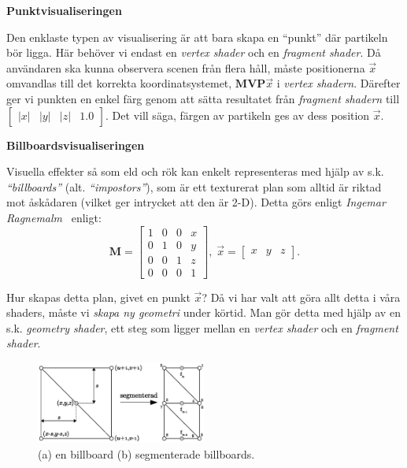\documentclass[a4paper]{article}
\begin{document}
\begin{multicols}{2}
\textbf{Punktvisualiseringen}

Den enklaste typen av visualisering är att bara skapa en ``punkt'' där partikeln bör ligga. Här behöver vi endast en \emph{vertex shader} och en \emph{fragment shader}. Då användaren ska kunna observera scenen från flera håll, måste positionerna \(\vec{x}\) omvandlas till det korrekta koordinatsystemet, \(\mathbf{MVP}\vec{x}\) i \emph{vertex shadern}. Därefter ger vi punkten en enkel färg genom att sätta resultatet från \emph{fragment shadern} till \(\begin{bmatrix}|x| & |y| & |z| & 1.0\end{bmatrix}\). Det vill säga, färgen av partikeln ges av dess position \(\vec{x}\).

\textbf{Billboardsvisualiseringen}

Visuella effekter så som eld och rök kan enkelt representeras med hjälp av s.k. \emph{``billboards''} (alt. \emph{``impostors''}), som är ett texturerat plan som alltid är riktad mot åskådaren (vilket ger intrycket att den är 2-D). Detta görs enligt \emph{Ingemar Ragnemalm}~\cite{ragnemalm2008polygons} enligt: \[\mathbf{M} = \begin{bmatrix} 1 & 0 & 0 & x \\
                                    0 & 1 & 0 & y \\
                                    0 & 0 & 1 & z \\
                                    0 & 0 & 0 & 1 \end{bmatrix}, \;
          \vec{x} = \begin{bmatrix}x & y & z\end{bmatrix}.\]

\vspace{-0.25cm}
Hur skapas detta plan, givet en punkt \(\vec{x}\)? Då vi har valt att göra allt detta i våra shaders, måste vi \emph{skapa ny geometri} under körtid. Man gör detta med hjälp av en s.k. \emph{geometry shader}, ett steg som ligger mellan en \emph{vertex shader} och en \emph{fragment shader}.

\vspace{-0.3cm}
\begin{figure}[H]
\center
\includegraphics[width=0.5\textwidth]{share/Billboards.eps}
\caption{(a) en billboard (b) segmenterade billboards.}
\label{fig:bill}
\end{figure}
\vspace{-0.3cm}


\end{multicols}
\end{document}
